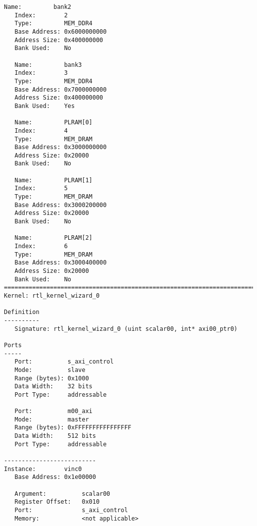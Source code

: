 \begin{lstlisting}[label=func,breakatwhitespace=false,caption=Содержимое vinc.xclbin.info файла.]
   Name:         bank2
   Index:        2
   Type:         MEM_DDR4
   Base Address: 0x6000000000
   Address Size: 0x400000000
   Bank Used:    No

   Name:         bank3
   Index:        3
   Type:         MEM_DDR4
   Base Address: 0x7000000000
   Address Size: 0x400000000
   Bank Used:    Yes

   Name:         PLRAM[0]
   Index:        4
   Type:         MEM_DRAM
   Base Address: 0x3000000000
   Address Size: 0x20000
   Bank Used:    No

   Name:         PLRAM[1]
   Index:        5
   Type:         MEM_DRAM
   Base Address: 0x3000200000
   Address Size: 0x20000
   Bank Used:    No

   Name:         PLRAM[2]
   Index:        6
   Type:         MEM_DRAM
   Base Address: 0x3000400000
   Address Size: 0x20000
   Bank Used:    No
==============================================================================
Kernel: rtl_kernel_wizard_0

Definition
----------
   Signature: rtl_kernel_wizard_0 (uint scalar00, int* axi00_ptr0)

Ports
-----
   Port:          s_axi_control
   Mode:          slave
   Range (bytes): 0x1000
   Data Width:    32 bits
   Port Type:     addressable

   Port:          m00_axi
   Mode:          master
   Range (bytes): 0xFFFFFFFFFFFFFFFF
   Data Width:    512 bits
   Port Type:     addressable

--------------------------
Instance:        vinc0
   Base Address: 0x1e00000

   Argument:          scalar00
   Register Offset:   0x010
   Port:              s_axi_control
   Memory:            <not applicable>


\end{lstlisting}
